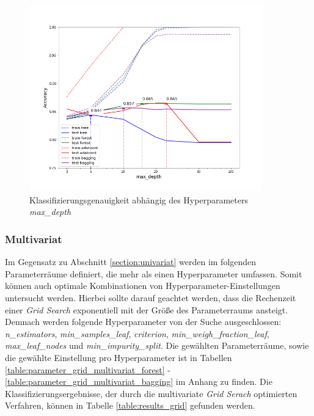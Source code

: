 \begin{figure}[ht]
	\centering
	\vspace*{-1.5 cm}
	\includegraphics[width = 0.9\textwidth]{Bilder/grid_search_max_depth.png}
	\caption{Klassifizierungsgenauigkeit abhängig des Hyperparameters \emph{max\_depth}}
	\label{fig:grid_search_max_depth_tree}
\end{figure}

 
\subsubsection{Multivariat}
Im Gegensatz zu Abschnitt \ref{section:univariat} werden im folgenden Parameterräume definiert, die mehr als einen Hyperparameter umfassen. Somit können auch optimale Kombinationen von Hyperparameter-Einstellungen untersucht werden. Hierbei sollte darauf geachtet werden, dass die Rechenzeit einer \emph{Grid Search} exponentiell mit der Größe des Parameterraums ansteigt. Demnach werden folgende Hyperparameter von der Suche ausgeschlossen: \emph{n\_estimators}, \emph{min\_samples\_leaf}, \emph{criterion}, \emph{min\_weigh\_fraction\_leaf}, \emph{max\_leaf\_nodes} und \emph{min\_impurity\_split}. Die gewählten Parameterräume, sowie die gewählte Einstellung pro Hyperparameter ist in Tabellen \ref{table:parameter_grid_multivariat_forest} - \ref{table:parameter_grid_multivariat_bagging} im Anhang zu finden. Die Klassifizierungsergebnisse, der durch die multivariate \emph{Grid Serach} optimierten Verfahren, können in Tabelle \ref{table:results_grid} gefunden werden.

